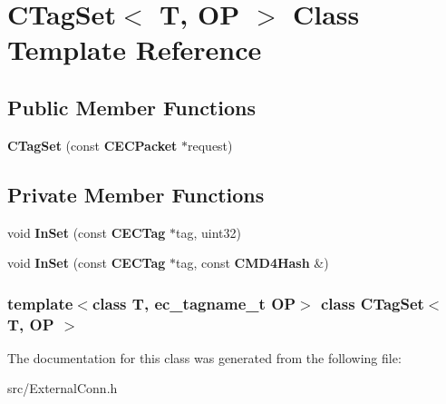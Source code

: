 \section{CTagSet$<$ T, OP $>$ Class Template Reference}
\label{classCTagSet}
\subsection*{Public Member Functions}
\begin{DoxyCompactItemize}
\item 
{\bfseries CTagSet} (const {\bf CECPacket} $\ast$request)\label{classCTagSet_a7dc2b40ae27747e4c4cf5ae474d15c9b}

\end{DoxyCompactItemize}
\subsection*{Private Member Functions}
\begin{DoxyCompactItemize}
\item 
void {\bfseries InSet} (const {\bf CECTag} $\ast$tag, uint32)\label{classCTagSet_ae7ca08b5a4270f83d2b38e3be5a2dc6b}

\item 
void {\bfseries InSet} (const {\bf CECTag} $\ast$tag, const {\bf CMD4Hash} \&)\label{classCTagSet_acd7c39640cc14c2ff39470cf07177203}

\end{DoxyCompactItemize}
\subsubsection*{template$<$class T, ec\_\-tagname\_\-t OP$>$ class CTagSet$<$ T, OP $>$}



The documentation for this class was generated from the following file:\begin{DoxyCompactItemize}
\item 
src/ExternalConn.h\end{DoxyCompactItemize}
